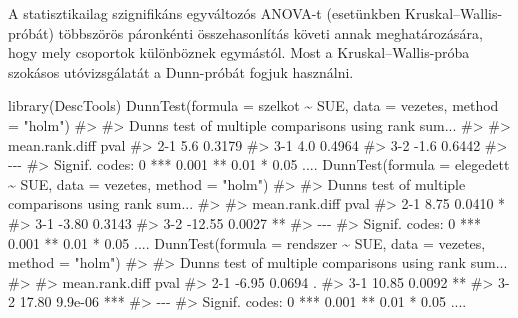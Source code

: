 \documentclass[
  letterpaper,
]{krantz}
\makeatletter
\newenvironment{Shaded}{\begin{snugshade}}{\end{snugshade}}
\newcommand{\AttributeTok}[1]{\textcolor[rgb]{0.40,0.45,0.13}{#1}}
\newcommand{\CommentTok}[1]{\textcolor[rgb]{0.37,0.37,0.37}{#1}}
\newcommand{\FunctionTok}[1]{\textcolor[rgb]{0.28,0.35,0.67}{#1}}
\newcommand{\NormalTok}[1]{\textcolor[rgb]{0.00,0.23,0.31}{#1}}
\newcommand{\SpecialCharTok}[1]{\textcolor[rgb]{0.37,0.37,0.37}{#1}}
\newcommand{\StringTok}[1]{\textcolor[rgb]{0.13,0.47,0.30}{#1}}
\newenvironment{kframe}{%
\medskip{}
\setlength{\fboxsep}{.8em}
 \def\at@end@of@kframe{}%
 \ifinner\ifhmode%
  \def\at@end@of@kframe{\end{minipage}}%
  \begin{minipage}{\columnwidth}%
 \fi\fi%
 \def\FrameCommand##1{\hskip\@totalleftmargin \hskip-\fboxsep
 \colorbox{shadecolor}{##1}\hskip-\fboxsep
     \hskip-\linewidth \hskip-\@totalleftmargin \hskip\columnwidth}%
 \MakeFramed {\advance\hsize-\width
   \@totalleftmargin\z@ \linewidth\hsize
   \@setminipage}}%
 {\par\unskip\endMakeFramed%
 \at@end@of@kframe}
\renewenvironment{Shaded}{\begin{kframe}}{\end{kframe}}
\makeatother
\begin{document}
A statisztikailag szignifikáns egyváltozós ANOVA-t (esetünkben
Kruskal--Wallis-próbát) többszörös páronkénti összehasonlítás követi
annak meghatározására, hogy mely csoportok különböznek egymástól. Most a
Kruskal--Wallis-próba szokásos utóvizsgálatát a Dunn-próbát fogjuk
használni.

\begin{Shaded}
\begin{Highlighting}[]
\FunctionTok{library}\NormalTok{(DescTools)}
\FunctionTok{DunnTest}\NormalTok{(}\AttributeTok{formula =}\NormalTok{ szelkot }\SpecialCharTok{\textasciitilde{}}\NormalTok{ SUE, }\AttributeTok{data =}\NormalTok{ vezetes, }\AttributeTok{method =} \StringTok{"holm"}\NormalTok{)}
\CommentTok{\#\textgreater{} }
\CommentTok{\#\textgreater{}  Dunn\textquotesingle{}s test of multiple comparisons using rank sum...}
\CommentTok{\#\textgreater{} }
\CommentTok{\#\textgreater{}     mean.rank.diff   pval    }
\CommentTok{\#\textgreater{} 2{-}1            5.6 0.3179    }
\CommentTok{\#\textgreater{} 3{-}1            4.0 0.4964    }
\CommentTok{\#\textgreater{} 3{-}2           {-}1.6 0.6442    }
\CommentTok{\#\textgreater{} {-}{-}{-}}
\CommentTok{\#\textgreater{} Signif. codes:  0 \textquotesingle{}***\textquotesingle{} 0.001 \textquotesingle{}**\textquotesingle{} 0.01 \textquotesingle{}*\textquotesingle{} 0.05 \textquotesingle{}....}
\FunctionTok{DunnTest}\NormalTok{(}\AttributeTok{formula =}\NormalTok{ elegedett }\SpecialCharTok{\textasciitilde{}}\NormalTok{ SUE, }\AttributeTok{data =}\NormalTok{ vezetes, }\AttributeTok{method =} \StringTok{"holm"}\NormalTok{)}
\CommentTok{\#\textgreater{} }
\CommentTok{\#\textgreater{}  Dunn\textquotesingle{}s test of multiple comparisons using rank sum...}
\CommentTok{\#\textgreater{} }
\CommentTok{\#\textgreater{}     mean.rank.diff   pval    }
\CommentTok{\#\textgreater{} 2{-}1           8.75 0.0410 *  }
\CommentTok{\#\textgreater{} 3{-}1          {-}3.80 0.3143    }
\CommentTok{\#\textgreater{} 3{-}2         {-}12.55 0.0027 ** }
\CommentTok{\#\textgreater{} {-}{-}{-}}
\CommentTok{\#\textgreater{} Signif. codes:  0 \textquotesingle{}***\textquotesingle{} 0.001 \textquotesingle{}**\textquotesingle{} 0.01 \textquotesingle{}*\textquotesingle{} 0.05 \textquotesingle{}....}
\FunctionTok{DunnTest}\NormalTok{(}\AttributeTok{formula =}\NormalTok{ rendszer }\SpecialCharTok{\textasciitilde{}}\NormalTok{ SUE, }\AttributeTok{data =}\NormalTok{ vezetes, }\AttributeTok{method =} \StringTok{"holm"}\NormalTok{)}
\CommentTok{\#\textgreater{} }
\CommentTok{\#\textgreater{}  Dunn\textquotesingle{}s test of multiple comparisons using rank sum...}
\CommentTok{\#\textgreater{} }
\CommentTok{\#\textgreater{}     mean.rank.diff    pval    }
\CommentTok{\#\textgreater{} 2{-}1          {-}6.95  0.0694 .  }
\CommentTok{\#\textgreater{} 3{-}1          10.85  0.0092 ** }
\CommentTok{\#\textgreater{} 3{-}2          17.80 9.9e{-}06 ***}
\CommentTok{\#\textgreater{} {-}{-}{-}}
\CommentTok{\#\textgreater{} Signif. codes:  0 \textquotesingle{}***\textquotesingle{} 0.001 \textquotesingle{}**\textquotesingle{} 0.01 \textquotesingle{}*\textquotesingle{} 0.05 \textquotesingle{}....}
\end{Highlighting}
\end{Shaded}
\end{document}
